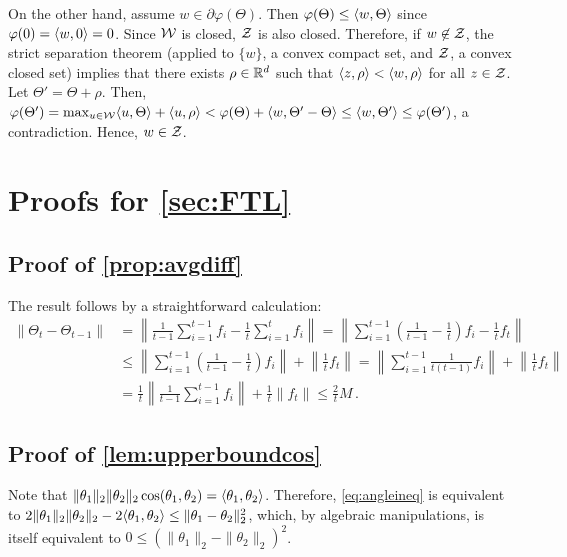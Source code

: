 On the other hand, assume $w \in \partial \varphi(\Theta)$. Then $\varphi(\Theta) \le \langle w,\Theta\rangle$
since $\varphi(0) = \langle w,0\rangle = 0$. 
Since $\mathcal{W}$ is closed, $\mathcal{Z}$ is also closed. Therefore, if $w \not\in\mathcal{Z}$,
the strict separation theorem (applied to $\{w\}$, a convex compact set,
and $\mathcal{Z}$, a convex closed set) implies that
 there exists $\rho\in \mathbb{R}^d$ such that $\langle z,\rho\rangle < \langle w,\rho\rangle$ for all $z\in \mathcal{Z}$.
 Let $\Theta' = \Theta +  \rho$.
 Then, $\varphi(\Theta') = \max_{u\in \mathcal{W}} \langle u,\Theta\rangle +  \langle u,\rho\rangle
 < \varphi(\Theta) +  \langle w,\Theta'-\Theta\rangle \le \langle w,\Theta'\rangle \le \varphi(\Theta')$, a contradiction.
Hence, $w\in \mathcal{Z}$.

\section{Proofs for \cref{sec:FTL}}
\subsection{Proof of \cref{prop:avgdiff}}
The result follows by a straightforward calculation:
\begin{align*}
\|\Theta_t - \Theta_{t-1} \| & = \left\|\frac{1}{t-1}\sum_{i=1}^{t-1} f_i - \frac{1}{t}\sum_{i=1}^{t} f_i \right\| 
	 = \left\| \sum_{i=1}^{t-1} \left( \frac{1}{t-1} - \frac{1}{t}\right) f_i- \frac{1}{t}f_t\right\| \\
	& \le \left\| \sum_{i=1}^{t-1} \left( \frac{1}{t-1} - \frac{1}{t}\right) f_i \right\| + \left\| \frac{1}{t}f_t\right\| 
	 = \left\| \sum_{i=1}^{t-1} \frac{1}{t(t-1)} f_i \right\| + \left\| \frac{1}{t}f_t\right\| \\
	 & = \frac{1}{t} \left\| \frac{1}{t-1} \sum_{i=1}^{t-1} f_i\right\| + \frac{1}{t}\left\|f_t\right\| 
	 \le \frac{2}{t}M\,.
\end{align*}

\subsection{Proof of \cref{lem:upperboundcos}}
Note that $\|\theta_1\|_2\|\theta_2\|_2\cos(\theta_1,\theta_2) = \langle \theta_1, \theta_2\rangle$.
Therefore, \eqref{eq:angleineq} is equivalent to 
$ 2\|\theta_1\|_2\|\theta_2\|_2 - 2\langle \theta_1, \theta_2\rangle \le \|\theta_1 - \theta_2\|_2^2 $,
which, by algebraic manipulations, is itself equivalent to $0 \le (\|\theta_1\|_2-\|\theta_2\|_2)^2$.

